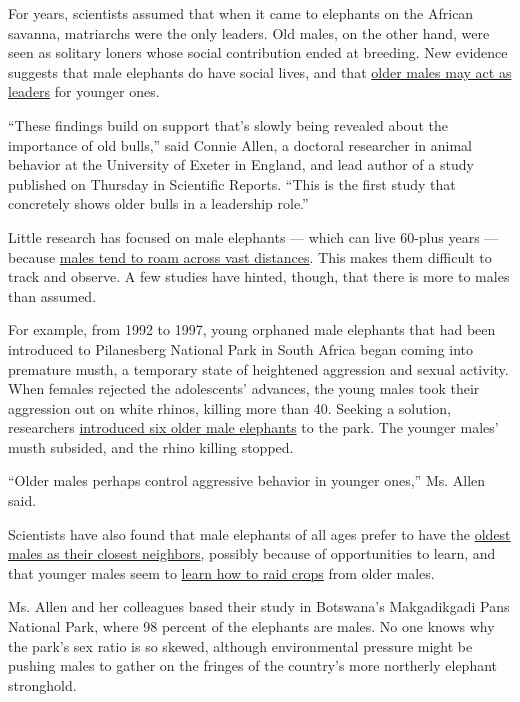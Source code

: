 For years, scientists assumed that when it came to elephants on the
African savanna, matriarchs were the only leaders. Old males, on the
other hand, were seen as solitary loners whose social contribution ended
at breeding. New evidence suggests that male elephants do have social
lives, and that
\href{https://www.nature.com/articles/s41598-020-70682-y}{older males
may act as leaders} for younger ones.

``These findings build on support that's slowly being revealed about the
importance of old bulls,'' said Connie Allen, a doctoral researcher in
animal behavior at the University of Exeter in England, and lead author
of a study published on Thursday in Scientific Reports. ``This is the
first study that concretely shows older bulls in a leadership role.''

Little research has focused on male elephants --- which can live 60-plus
years --- because
\href{https://www.nytimes3xbfgragh.onion/2016/03/18/world/an-african-elephant-named-morgan-strays-into-a-war-zone-and-survives.html}{males
tend to roam across vast distances}. This makes them difficult to track
and observe. A few studies have hinted, though, that there is more to
males than assumed.

For example, from 1992 to 1997, young orphaned male elephants that had
been introduced to Pilanesberg National Park in South Africa began
coming into premature musth, a temporary state of heightened aggression
and sexual activity. When females rejected the adolescents' advances,
the young males took their aggression out on white rhinos, killing more
than 40. Seeking a solution, researchers
\href{https://www.nature.com/articles/35044191?proof=true}{introduced
six older male elephants} to the park. The younger males' musth
subsided, and the rhino killing stopped.

``Older males perhaps control aggressive behavior in younger ones,'' Ms.
Allen said.

Scientists have also found that male elephants of all ages prefer to
have the
\href{https://www.idausa.org/wp-content/uploads/2013/05/EvansHarris-male-sociality2-2.pdf}{oldest
males as their closest neighbors}, possibly because of opportunities to
learn, and that younger males seem to
\href{https://journals.plos.org/plosone/article?id=10.1371/journal.pone.0031382}{learn
how to raid crops} from older males.

Ms. Allen and her colleagues based their study in Botswana's
Makgadikgadi Pans National Park, where 98 percent of the elephants are
males. No one knows why the park's sex ratio is so skewed, although
environmental pressure might be pushing males to gather on the fringes
of the country's more northerly elephant stronghold.

